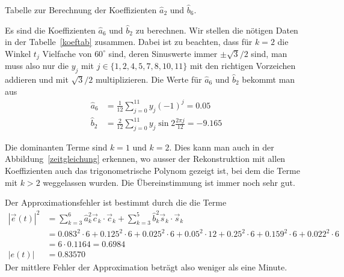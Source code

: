 \begin{loesung}
\begin{table}
\caption{Tabelle zur Berechnung der Koeffizienten $\hat a_2$ und $\hat b_6$.
\label{koeftab}}
\end{table}
\begin{teilaufgaben}
\item
Es sind die Koeffizienten $\hat a_6$ und $\hat b_2$ zu berechnen.
Wir stellen die nötigen Daten in der Tabelle~\ref{koeftab} zusammen.
Dabei ist zu beachten, dass für $k=2$ die Winkel $t_j$ Vielfache von $60^\circ$
sind, deren Sinuswerte immer $\pm\!\sqrt{3}/2$ sind, man muss also nur 
die $y_j$ mit $j\in\{1,2,4,5,7,8,10,11\}$ mit den richtigen Vorzeichen
addieren und mit $\!\sqrt{3}/2$ multiplizieren.
Die Werte für $\hat a_6$ und $\hat b_2$ bekommt man aus
\begin{align*}
\hat a_6
&=
\frac{1}{12}
\sum_{j=0}^{11}
y_j (-1)^j
=
0.05
\\
\hat b_2
&=
\frac{2}{12}
\sum_{j=0}^{11}
y_j \sin 2\frac{2\pi j}{12}
=
-9.165
\end{align*}
\item
Die dominanten Terme sind $k=1$ und $k=2$.
Dies kann man auch in der Abbildung~\ref{zeitgleichung} erkennen, wo
ausser der Rekonstruktion mit allen Koeffizienten auch das
trigonometrische Polynom gezeigt ist, bei dem die Terme mit $k>2$ weggelassen
wurden.
Die Übereinstimmung ist immer noch sehr gut.
\item
Der Approximationsfehler ist bestimmt durch die die Terme 
\begin{align*}
|\vec{e}(t)|^2
&=
\sum_{k=3}^6 \hat a_k^2 \vec{c}_k\cdot\vec{c}_k
+
\sum_{k=3}^5 \hat b_k^2 \vec{s}_k\cdot\vec{s}_k
\\
&=
0.083^2\cdot 6
+0.125^2\cdot 6
+0.025^2\cdot 6
+0.05^2\cdot 12
+0.25^2\cdot 6
+0.159^2\cdot 6
+0.022^2\cdot 6
\\
&=
6\cdot 0.1164
=
0.6984
\\
|e(t)|
&=
0.83570
\end{align*}
Der mittlere Fehler der Approximation beträgt also weniger als eine Minute.
\qedhere
\end{teilaufgaben}
\end{loesung}


